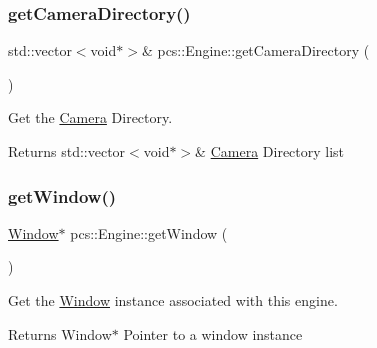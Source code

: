 \mbox{\label{classpcs_1_1Engine_a71059ef96479c7ca59901bfa0be2587a}} 
\subsubsection{\texorpdfstring{get\+Camera\+Directory()}{getCameraDirectory()}}
{\footnotesize\ttfamily std\+::vector$<$void$\ast$$>$\& pcs\+::\+Engine\+::get\+Camera\+Directory (\begin{DoxyParamCaption}{ }\end{DoxyParamCaption})\hspace{0.3cm}{\ttfamily [inline]}}



Get the \hyperlink{classpcs_1_1Camera}{Camera} Directory. 

\begin{DoxyReturn}{Returns}
std\+::vector$<$void$\ast$$>$\& \hyperlink{classpcs_1_1Camera}{Camera} Directory list 
\end{DoxyReturn}
\mbox{\label{classpcs_1_1Engine_a3bf8432ad5c397ea7bb3f95728fa9792}} 
\subsubsection{\texorpdfstring{get\+Window()}{getWindow()}}
{\footnotesize\ttfamily \hyperlink{classpcs_1_1Window}{Window}$\ast$ pcs\+::\+Engine\+::get\+Window (\begin{DoxyParamCaption}{ }\end{DoxyParamCaption})\hspace{0.3cm}{\ttfamily [inline]}}



Get the \hyperlink{classpcs_1_1Window}{Window} instance associated with this engine. 

\begin{DoxyReturn}{Returns}
Window$\ast$ Pointer to a window instance 
\end{DoxyReturn}
\mbox{\label{classpcs_1_1Engine_ab43d2dd55c8519da49f92e7ccef042a8}} 
